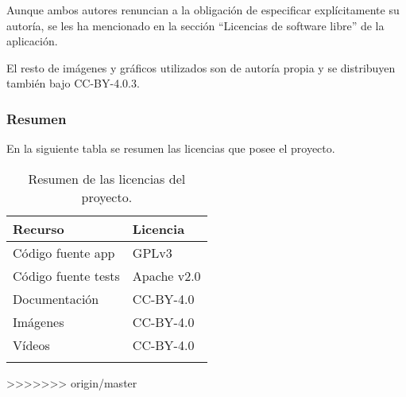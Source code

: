 Aunque ambos autores renuncian a la obligación de especificar
explícitamente su autoría, se les ha mencionado en la sección
``Licencias de software libre'' de la aplicación.

El resto de imágenes y gráficos utilizados son de autoría propia y se
distribuyen también bajo CC-BY-4.0.3.

\subsubsection{Resumen}\label{resumen-1}

En la siguiente tabla se resumen las licencias que posee el proyecto.

\begin{longtable}[]{@{}ll@{}}
\toprule
\begin{minipage}[b]{0.31\columnwidth}\raggedright\strut
Recurso\strut
\end{minipage} & \begin{minipage}[b]{0.21\columnwidth}\raggedright\strut
Licencia\strut
\end{minipage}\tabularnewline
\midrule
\endhead
\begin{minipage}[t]{0.31\columnwidth}\raggedright\strut
Código fuente app\strut
\end{minipage} & \begin{minipage}[t]{0.21\columnwidth}\raggedright\strut
GPLv3\strut
\end{minipage}\tabularnewline
\begin{minipage}[t]{0.31\columnwidth}\raggedright\strut
Código fuente tests\strut
\end{minipage} & \begin{minipage}[t]{0.21\columnwidth}\raggedright\strut
Apache v2.0\strut
\end{minipage}\tabularnewline
\begin{minipage}[t]{0.31\columnwidth}\raggedright\strut
Documentación\strut
\end{minipage} & \begin{minipage}[t]{0.21\columnwidth}\raggedright\strut
CC-BY-4.0\strut
\end{minipage}\tabularnewline
\begin{minipage}[t]{0.31\columnwidth}\raggedright\strut
Imágenes\strut
\end{minipage} & \begin{minipage}[t]{0.21\columnwidth}\raggedright\strut
CC-BY-4.0\strut
\end{minipage}\tabularnewline
\begin{minipage}[t]{0.31\columnwidth}\raggedright\strut
Vídeos\strut
\end{minipage} & \begin{minipage}[t]{0.21\columnwidth}\raggedright\strut
CC-BY-4.0\strut
\end{minipage}\tabularnewline
\bottomrule
\caption{Resumen de las licencias del proyecto.}
\end{longtable}
>>>>>>> origin/master

